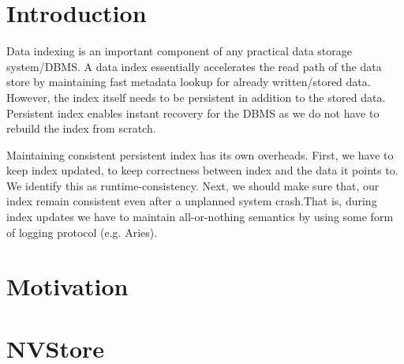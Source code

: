\section{Introduction}
Data indexing is an important component of any practical data storage system/DBMS.
A data index essentially accelerates the read path of the data store by maintaining
fast metadata lookup for already written/stored data. However, the index itself 
needs to be persistent in addition to the stored data. Persistent index enables 
instant recovery for the DBMS as we do not have to rebuild the index from scratch.

Maintaining consistent persistent index has its own overheads. First, we have to keep 
index updated, to keep correctness between index and the data it points to. We identify
this as runtime-consistency. Next, we should make sure that, our index remain consistent
even after a unplanned system crash.That is, during index updates we have to maintain
all-or-nothing semantics by using some form of logging protocol (e.g. Aries).







\section{Motivation}

\cite{pmwcas}



\section{NVStore}

